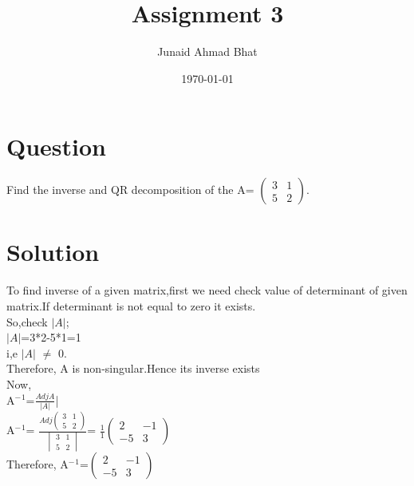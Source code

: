 \documentclass[a4paper,12pt]{article}
\begin{document}
\title{Assignment 3}
\author{Junaid Ahmad Bhat}
\date{\today}
\maketitle
\section*{\small Question}
Find the inverse and QR decomposition of the A= $\begin{pmatrix} 3 & 1  \\ 5 & 2 \end{pmatrix}$.\\
\section*{\small Solution}To find inverse of a given matrix,first we need check value of determinant of given matrix.If determinant is not equal to zero it exists.\\

So,check $|A|$;\\

$|A|$=3*2-5*1=1\\

i,e $|A|$ $\not=$ 0.\\

Therefore, A is non-singular.Hence its inverse exists\\

Now,\\

A$^-$$^1$=$\frac{Adj A}{|A|}$|\\

A$^-$$^1$= $\frac{ Adj\begin{pmatrix} 3 & 1  \\ 5 & 2 \end{pmatrix} }{\begin{vmatrix} 3 & 1  \\ 5 & 2 \end{vmatrix}}$= $\frac{1}{1}$$\begin{pmatrix} 2 & -1  \\ -5 & 3 \end{pmatrix}$\\
         
Therefore,   A$^-$$^1$=$\begin{pmatrix} 2 & -1  \\ -5 & 3 \end{pmatrix}$\\
\pagebreak
\end{document}
